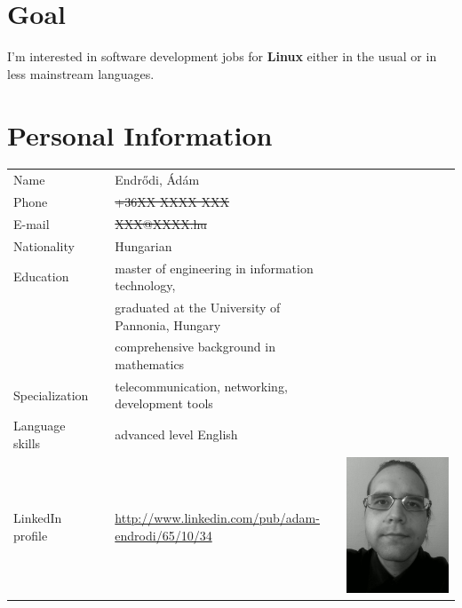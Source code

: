 \documentclass[a4paper,12pt]{article}
\newcommand\Yell{\textbf}
\begin{document}
\section{Goal}

I'm interested in software development jobs for \Yell{Linux} either in
the usual or in less mainstream languages.

\section{Personal Information}

\begin{tabularx}{\linewidth}{lXll}
Name			&& Endr\H{o}di, \'Ad\'am	&			\\
Phone			&& \sout{+36XX XXXX XXX}	&			\\
E-mail			&& \sout{XXX@XXXX.hu}		&			\\
Nationality		&& Hungarian			&			\\
Education		&& master of engineering in information technology, &	\\
			&& graduated at the University of Pannonia, Hungary &	\\
			&& comprehensive background in mathematics &		\\
Specialization		&& telecommunication, networking, development tools &	\\
Language skills		&& advanced level English	&			\\
LinkedIn profile	&& \url{http://www.linkedin.com/pub/adam-endrodi/65/10/34}
			 & \includegraphics*[bb=0 0 72 1,clip=false]{me_2012}	\\
\end{tabularx}
\end{document}
